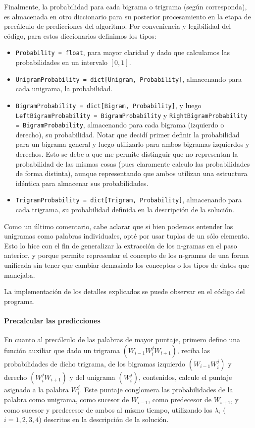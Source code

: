 \documentclass[a4paper]{article}
\begin{document}
Finalmente, la probabilidad para cada bigrama o trigrama (según corresponda), es almacenada en otro diccionario para su posterior procesamiento en la etapa de precálculo de predicciones del algoritmo. Por conveniencia y legibilidad del código, para estos diccionarios definimos los tipos:

\begin{itemize}
    \item \texttt{Probability = float}, para mayor claridad y dado que calculamos las probabilidades en un intervalo $[0,1]$.
    \item \texttt{UnigramProbability = dict[Unigram, Probability]}, almacenando para cada unigrama, la probabilidad.
    \item \texttt{BigramProbability = dict[Bigram, Probability]}, y luego \texttt{LeftBigramProbability = BigramProbability} y \texttt{RightBigramProbability = BigramProbability}, almacenando para cada bigrama (izquierdo o derecho), su probabilidad. Notar que decidí primer definir la probabilidad para un bigrama general y luego utilizarlo para ambos bigramas izquierdos y derechos. Esto se debe a que me permite distinguir que no representan la probabilidad de las mismas cosas (pues claramente calculo las probabilidades de forma distinta), aunque representando que ambos utilizan una estructura idéntica para almacenar sus probabilidades.
     \item \texttt{TrigramProbability = dict[Trigram, Probability]}, almacenando para cada trigrama, su probabilidad definida en la descripción de la solución.
\end{itemize}

Como un último comentario, cabe aclarar que si bien podemos entender los unigramas como palabras individuales, opté por usar tuplas de un sólo elemento. Esto lo hice con el fin de generalizar la extracción de los n-gramas en el paso anterior, y porque permite representar el concepto de los n-gramas de una forma unificada sin tener que cambiar demasiado los conceptos o los tipos de datos que manejaba. 

La implementación de los detalles explicados se puede observar en el código del programa.

\paragraph{Precalcular las predicciones}

En cuanto al precálculo de las palabras de mayor puntaje, primero defino una función auxiliar que dado un trigrama $(W_{i-1} W_i^j W_{i+1})$, reciba las probabilidades de dicho trigrama, de los bigramas izquierdo $(W_{i-1} W_i^j)$ y derecho $(W_i^j W_{i+1})$ y del unigrama $(W_i^j)$, contenidos, calcule el puntaje asignado a la palabra $W_i^j$. Este puntaje conglomera las probabilidades de la palabra como unigrama, como sucesor de $W_{i-1}$, como predecesor de $W_{i+1}$, y como sucesor y predecesor de ambos al mismo tiempo, utilizando los $\lambda_i$ ($i = 1,2,3,4$) descritos en la descripción de la solución.
\end{document}

